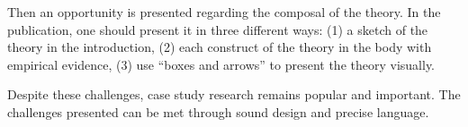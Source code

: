 \documentclass[a4paper,12pt,english]{scrartcl}
\begin{document}
Then an opportunity is presented regarding the composal of the theory. In the publication, one should present it in three different ways: (1) a sketch of the theory in the introduction, (2) each construct of the theory in the body with empirical evidence, (3) use \enquote{boxes and arrows} to present the theory visually.

Despite these challenges, case study research remains popular and important. The challenges presented can be met through sound design and precise language.
\end{document}
